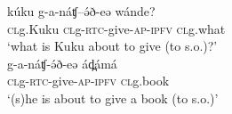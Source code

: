 \ex \gll	kúku 	g-a-náʧ--ə́ð-eə 			wánde?\\		
	\textsc{cl}g.Kuku	\textsc{cl}g-\textsc{rtc}-give-\textsc{ap-\textsc{ipfv}}	\textsc{cl}g.what\\
	\glt ‘what is Kuku about to give (to s.o.)?’\\

\ex \gll	g-a-náʧ-ə́ð-eə 		ád̪ámá  \\
	\textsc{cl}g-\textsc{rtc}-give-\textsc{ap-\textsc{ipfv}}	\textsc{cl}g.book \\
	\glt ‘(s)he is about to give a book (to s.o.)’\\
\z
\z



%
%
%

%


